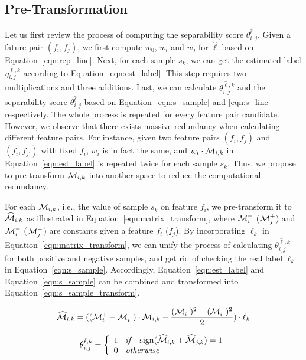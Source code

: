 \subsection{Pre-Transformation} \label{ssec:trans}
 Let us first review the process of computing the separability score $\theta_{i,j}^{\hat{\ell}}$. Given a fature pair $(f_i,f_j)$, we first compute $w_0$, $w_i$ and $w_j$ for $\hat{\ell}$ based on Equation~\ref{eqn:rep_line}. Next, for each sample $s_k$, we can get the estimated label $\eta_{i,j}^{\hat{\ell},k}$ according to Equation~\ref{eqn:est_label}. This step requires two multiplications and three additions. Last, we can calculate $\theta_{i,j}^{\hat{\ell},k}$ and the separability score $\theta_{i,j}^{\hat{\ell}}$ based on Equation~\ref{eqn:s_sample} and \ref{eqn:s_line} respectively. The whole process is repeated for every feature pair candidate. However, we observe that there exists massive redundancy when calculating different feature pairs. For instance, given two feature pairs $(f_i,f_j)$ and $(f_i,f_{j'})$ with fixed $f_i$, $w_i$ is in fact the same, and $w_i\cdot \mm_{i,k}$ in Equation~\ref{eqn:est_label} is repeated twice for each sample $s_k$. Thus, we propose to pre-transform $\mm_{i,k}$ into another space to reduce the computational redundancy.

 For each $\mm_{i,k}$, i.e., the value of sample $s_k$ on feature $f_i$, we pre-transform it to $\widehat{\mm}_{i,k}$ as illustrated in Equation~\ref{eqn:matrix_transform}, where $\mm_i^+$ ($\mm_j^+$) and $\mm_i^-$ ($\mm_j^-$) are constants given a feature $f_i$ ($f_j$). By incorporating $\ell_k$ in Equation~\ref{eqn:matrix_transform}, we can unify the process of calculating $\theta_{i,j}^{\hat{\ell},k}$ for both positive and negative samples, and get rid of checking the real label $\ell_k$ in Equation~\ref{eqn:s_sample}. Accordingly, Equation~\ref{eqn:est_label} and Equation~\ref{eqn:s_sample} can be combined and transformed into Equation~\ref{eqn:s_sample_transform}.

\begin{equation}\label{eqn:matrix_transform}
\widehat{\mm}_{i,k} = ((\mm_i^+-\mm_i^-)\cdot \mm_{i,k}-\frac{(\mm_i^+)^2-(\mm_i^-)^2}{2})\cdot \ell_k 
\end{equation}

\begin{equation}\label{eqn:s_sample_transform}
\theta_{i,j}^{\hat{\ell},k}=\left\{
                \begin{array}{ll}
                  1 \textit{\hspace{2mm} if \hspace{2mm}} \sign(\widehat{\mm}_{i,k} + \widehat{\mm}_{j,k}) = 1\\
                  0 \textit{\hspace{2mm} otherwise \hspace{2mm}} 
                \end{array}
              \right.
\end{equation}

